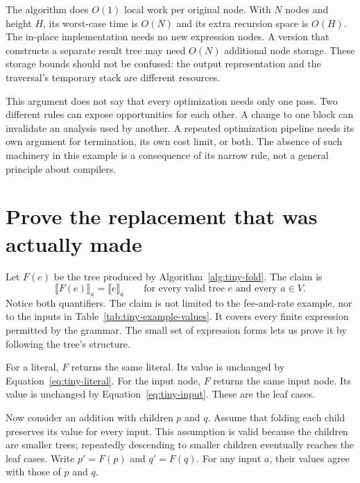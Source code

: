 The algorithm does $O(1)$ local work per original node.
With $N$ nodes and height $H$, its worst-case time is $O(N)$ and its extra recursion space is $O(H)$.
The in-place implementation needs no new expression nodes.
A version that constructs a separate result tree may need $O(N)$ additional node storage.
These storage bounds should not be confused: the output representation and the traversal's temporary stack are different resources.

This argument does not say that every optimization needs only one pass.
Two different rules can expose opportunities for each other.
A change to one block can invalidate an analysis used by another.
A repeated optimization pipeline needs its own argument for termination, its own cost limit, or both.
The absence of such machinery in this example is a consequence of its narrow rule, not a general principle about compilers.

\section{Prove the replacement that was actually made}
\label{sec:tiny-fold-proof}

Let $F(e)$ be the tree produced by Algorithm~\ref{alg:tiny-fold}.
The claim is
\begin{equation}
  \llbracket F(e)\rrbracket_a=\llbracket e\rrbracket_a
  \qquad\text{for every valid tree $e$ and every $a\in V$.}
  \label{eq:tiny-fold-correctness}
\end{equation}
Notice both quantifiers.
The claim is not limited to the fee-and-rate example, nor to the inputs in Table~\ref{tab:tiny-example-values}.
It covers every finite expression permitted by the grammar.
The small set of expression forms lets us prove it by following the tree's structure.

For a literal, $F$ returns the same literal.
Its value is unchanged by Equation~\ref{eq:tiny-literal}.
For the input node, $F$ returns the same input node.
Its value is unchanged by Equation~\ref{eq:tiny-input}.
These are the leaf cases.

Now consider an addition with children $p$ and $q$.
Assume that folding each child preserves its value for every input.
This assumption is valid because the children are smaller trees; repeatedly descending to smaller children eventually reaches the leaf cases.
Write $p'=F(p)$ and $q'=F(q)$.
For any input $a$, their values agree with those of $p$ and $q$.

